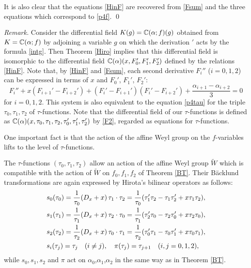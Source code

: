 It is also clear that the equations \eqref{HinF} are recovered 
from \eqref{Fsum} and the three equations which correspond to \eqref{p4f}. 
{\qed}
\par\medskip\noindent
{\em Remark.} \quad
Consider the differential field $K(g)={\Bbb C}(\alpha;f)(g)$ obtained 
from $K={\Bbb C}(\alpha;f)$ by adjoining a variable $g$ 
on which the derivation $'$ acts by the formula \eqref{intg}. 
Then Theorem \ref{Hiro} implies that this differential field is 
isomorphic to the differential field ${\Bbb C}(\alpha)(x,F_0',F_1',F_2')$
defined by the relations \eqref{HinF}. 
Note that, by \eqref{HinF} and \eqref{Fsum}, each second 
derivative $F_i''$ 
($i=0,1,2$) can be expressed  in terms of $x$ and $F_0'$, $F_1'$, 
$F_2'$: 
\begin{equation}\label{F2}
F_i''+x(F_{i+1}'-F_{i+2}')+(F_i'-F_{i+1}')(F_i'-F_{i+2}')+
\frac{\alpha_{i+1}-\alpha_{i+2}}{3}=0
\end{equation}
for $i=0,1,2$.
This system is also equivalent to the equation \eqref{p4tau} for 
the triple $\tau_0,\tau_1,\tau_2$ of $\tau$-functions. 
Note that the differential field of our $\tau$-functions is defined as 
${\Bbb C}(\alpha)(x,\tau_0,\tau_1,\tau_2,\tau_0',\tau_1',\tau_2')$ 
by \eqref{F2}, regarded as equations for $\tau$-functions. 
\par\medskip
One important fact is that the action of the affine Weyl group 
on the $f$-variables lifts to the level of $\tau$-functions. 
\begin{thm}\label{BTtau}
The $\tau$-functions $(\tau_0,\tau_1,\tau_2)$ allow 
an action of the affine Weyl group $\widetilde{W}$ which is compatible 
with the action of $\widetilde{W}$ on $f_0,f_1,f_2$ of Theorem \ref{BT}. 
Their B\"acklund transformations are again expressed by Hirota's 
bilinear operators as follows: 
\begin{equation}\label{bktau}
\begin{align}
&s_0(\tau_0)=\frac{1}{\tau_0}(D_x+x)\,\tau_1\cdot\tau_2=
\frac{1}{\tau_0}(\tau_1'\tau_2-\tau_1\tau_2'+x\tau_1\tau_2),\notag\\
&s_1(\tau_1)=\frac{1}{\tau_1}(D_x+x)\,\tau_2\cdot\tau_0=
\frac{1}{\tau_1}(\tau_2'\tau_0-\tau_2\tau_0'+x\tau_2\tau_0),\\
&s_2(\tau_2)=\frac{1}{\tau_2}(D_x+x)\,\tau_0\cdot\tau_1=
\frac{1}{\tau_2}(\tau_0'\tau_1-\tau_0\tau_1'+x\tau_0\tau_1),\notag\\
& s_i(\tau_j)=\tau_j\quad(i\ne j),\quad \pi(\tau_j)=\tau_{j+1}\quad(i,j=0,1,2),\notag
\end{align}
\end{equation}
while $s_0,s_1,s_2$ and $\pi$ act on $\alpha_0$,$\alpha_1$,$\alpha_2$
in the same way as in Theorem \ref{BT}. 
\end{thm}
